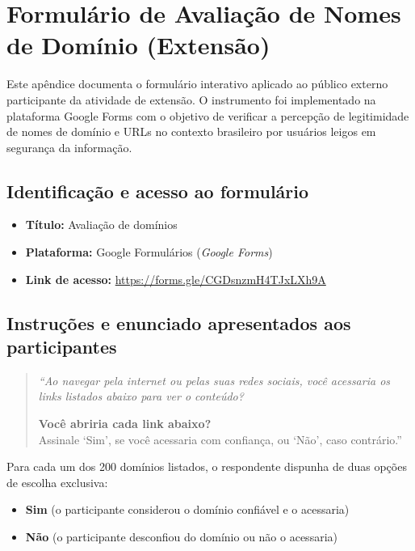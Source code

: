 \chapter{Formulário de Avaliação de Nomes de Domínio (Extensão)}
\label{ap:formulario}

Este apêndice documenta o formulário interativo aplicado ao público externo participante da atividade de extensão. O instrumento foi implementado na plataforma Google Forms com o objetivo de verificar a percepção de legitimidade de nomes de domínio e URLs no contexto brasileiro por usuários leigos em segurança da informação.

\section*{Identificação e acesso ao formulário}
\begin{itemize}
    \item \textbf{Título:} Avaliação de domínios
    \item \textbf{Plataforma:} Google Formulários (\emph{Google Forms})
    \item \textbf{Link de acesso:} \url{https://forms.gle/CGDsnzmH4TJxLXh9A} 
\end{itemize}

\section*{Instruções e enunciado apresentados aos participantes}

\begin{quote}
\itshape
``Ao navegar pela internet ou pelas suas redes sociais, você acessaria os links listados abaixo para ver o conteúdo?

\textbf{Você abriria cada link abaixo?} \\
Assinale `Sim', se você acessaria com confiança, ou `Não', caso contrário.''
\end{quote}

\noindent Para cada um dos 200 domínios listados, o respondente dispunha de duas opções de escolha exclusiva:
\begin{itemize}
    \item[\textbf{[ ]}] \textbf{Sim} (o participante considerou o domínio confiável e o acessaria)
    \item[\textbf{[ ]}] \textbf{Não} (o participante desconfiou do domínio ou não o acessaria)
\end{itemize}

